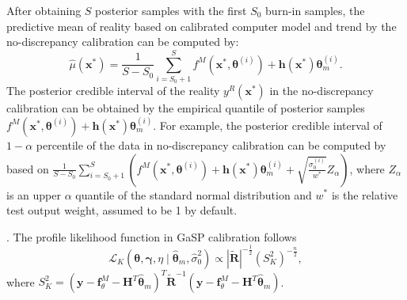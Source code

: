 After obtaining $S$ posterior samples with the first $S_0$ burn-in samples, the predictive mean of reality based on calibrated computer model and trend by the no-discrepancy calibration can be computed by:  
\[ \hat \mu(\mathbf x^*)=\frac{1}{S-S_0}\sum^S_{i=S_0+1} f^M(\mathbf x^*,  {\bm \theta}^{(i)} )+\mathbf h(\mathbf x^*)  {\bm \theta_m^{(i)}}.\]
The posterior credible interval of the reality $y^R(\mathbf x^*)$ in the no-discrepancy calibration can be obtained by the empirical quantile of posterior samples $ f^M(\mathbf x^*,  {\bm \theta}^{(i)} )+\mathbf h(\mathbf x^*)  {\bm \theta_m^{(i)}}$. For example, the posterior credible interval of $1-\alpha$ percentile of the data in no-discrepancy calibration can be computed by based on  %
$\frac{1}{S-S_0}\sum^S_{i=S_0+1}\left(f^M(\mathbf x^*,  {\bm \theta}^{(i)} )+\mathbf h(\mathbf x^*)  {\bm \theta_m^{(i)}}+\sqrt{\frac{\sigma^{(i)}_0}{ w^*} }Z_{\alpha}\right)$, 
where $Z_{\alpha}$ is an upper $\alpha$ quantile of the standard normal distribution and $w^*$ is the relative test output weight, assumed to be 1 by default. 

. 
The profile likelihood function in GaSP calibration   follows 
\begin{equation}
\mathcal L_K( \bm \theta, \bm \gamma, \eta \mid { \hat {\bm \theta}_m}, \hat \sigma^2_0 ) \propto  |{\mathbf {\tilde R} }|^{-\frac{1}{2}} (S^2_{K})^{-\frac{n}{2}}, 
\label{equ:PL_GP}
\end{equation}
 where $S^2_K=  (\mathbf{y}-\mathbf f^M_{\theta}- \mathbf H^T \hat{\bm \theta}_m  )^T  {{\mathbf { \tilde R}}}^{-1}(\mathbf{y}-\mathbf f^M_{\theta}- \mathbf H^T \hat{\bm \theta}_m  )$. 
 

